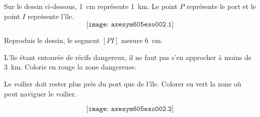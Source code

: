 Sur le dessin ci-dessous, 1~cm représente 1~km. Le point $P$
représente le port et le point $I$ représente l'île.
\[\texttt{[image: axesym605exo002.1]}\]
\begin{myenumerate}
\item Reproduis le dessin, le segment $[PI]$ mesure 6~cm.
\item L'île étant entourée de récifs dangereux, il ne faut pas s'en
approcher à moins de 3~km. Colorie en rouge la zone dangereuse.
\item Le voilier doit rester plus près du port que de l'île. Colorer
en vert la zone où peut naviguer le voilier.
\end{myenumerate}
\[\texttt{[image: axesym605exo002.2]}\]